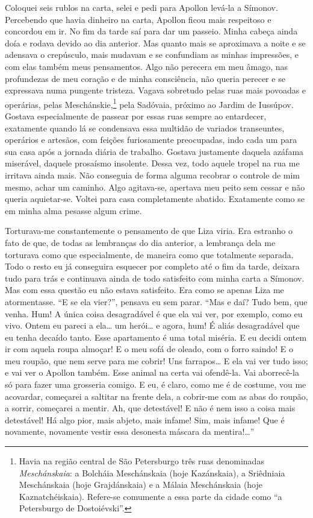Coloquei seis rublos na carta, selei e pedi para Apollon levá-la a
Símonov. Percebendo que havia dinheiro na carta, Apollon ficou mais
respeitoso e concordou em ir. No fim da tarde saí para dar um passeio.
Minha cabeça ainda doía e rodava devido ao dia anterior. Mas quanto
mais se aproximava a noite e se adensava o crepúsculo, mais mudavam e
se confundiam as minhas impressões, e com elas também meus pensamentos.
Algo não perecera em meu âmago, nas profundezas de meu coração e de
minha consciência, não queria perecer e se expressava numa pungente
tristeza. Vagava sobretudo pelas ruas mais povoadas e operárias, pelas
Meschánskie,\footnote{ Havia na região central de São Petersburgo três
ruas denominadas \textit{Meschánskaia}: a Bolcháia Meschánskaia (hoje
Kazánskaia), a Sriêdniaia Meschánskaia (hoje Grajdánskaia) e a Málaia
Meschánskaia (hoje Kaznatchéiskaia). Refere-se comumente a essa parte
da cidade como “a Petersburgo de Dostoiévski”.} pela Sadóvaia, próximo
ao Jardim de Iussúpov. Gostava especialmente de passear por essas ruas
sempre ao entardecer, exatamente quando lá se condensava essa multidão
de variados transeuntes, operários e artesãos, com feições furiosamente
preocupadas, indo cada um para sua casa após a jornada diária de
trabalho. Gostava justamente daquela azáfama miserável, daquele
prosaísmo insolente. Dessa vez, todo aquele tropel na rua me irritava
ainda mais. Não conseguia de forma alguma recobrar o controle de mim
mesmo, achar um caminho. Algo agitava-se, apertava meu peito sem cessar
e não queria aquietar-se. Voltei para casa completamente abatido.
Exatamente como se em minha alma pesasse algum crime.

Torturava-me constantemente o pensamento de que Liza viria. Era estranho
o fato de que, de todas as lembranças do dia anterior, a lembrança dela
me torturava como que especialmente, de maneira como que totalmente
separada. Todo o resto eu já conseguira esquecer por completo até o fim
da tarde, deixara tudo para trás e continuava ainda de todo satisfeito
com minha carta a Símonov. Mas com essa questão eu não estava
satisfeito. Era como se apenas Liza me atormentasse. “E se ela vier?”,
pensava eu sem parar. “Mas e daí? Tudo bem, que venha. Hum! A única
coisa desagradável é que ela vai ver, por exemplo, como eu vivo. Ontem
eu pareci a ela\ldots{} um herói\ldots{} e agora, hum! É aliás desagradável que eu
tenha decaído tanto. Esse apartamento é uma total miséria. E eu decidi
ontem ir com aquela roupa almoçar! E o meu sofá de oleado, com o forro
saindo! E o meu roupão, que nem serve para me cobrir! Uns farrapos\ldots{} E
ela vai ver tudo isso; e vai ver o Apollon também. Esse animal na certa
vai ofendê-la. Vai aborrecê-la só para fazer uma grosseria comigo. E
eu, é claro, como me é de costume, vou me acovardar, começarei a
saltitar na frente dela, a cobrir-me com as abas do roupão, a sorrir,
começarei a mentir. Ah, que detestável! E não é nem isso a coisa mais
detestável! Há algo pior, mais abjeto, mais infame! Sim, mais infame!
Que é novamente, novamente vestir essa desonesta máscara da
mentira!\ldots{}”


